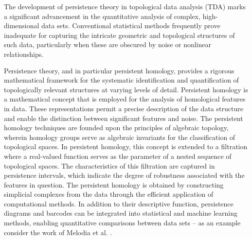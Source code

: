 The development of persistence theory in topological data analysis (TDA) marks a significant advancement in the quantitative analysis of complex, high-dimensional data sets. Conventional statistical methods frequently prove inadequate for capturing the intricate geometric and topological structures of such data, particularly when these are obscured by noise or nonlinear relationships.

Persistence theory, and in particular persistent homology, provides a rigorous mathematical framework for the systematic identification and quantification of topologically relevant structures at varying levels of detail. Persistent homology is a mathematical concept that is employed for the analysis of homological features in data. These representations permit a precise description of the data structure and enable the distinction between significant features and noise. The persistent homology techniques are founded upon the principles of algebraic topology, wherein homology groups serve as algebraic invariants for the classification of topological spaces. In persistent homology, this concept is extended to a filtration where a real-valued function serves as the parameter of a nested sequence of topological spaces. The characteristics of this filtration are captured in persistence intervals, which indicate the degree of robustness associated with the features in question. The persistent homology is obtained by constructing simplicial complexes from the data through the efficient application of computational methods. In addition to their descriptive function, persistence diagrams and barcodes can be integrated into statistical and machine learning methods, enabling quantitative comparisons between data sets -- as an example consider the work of Melodia et al. \cite{melodia2020persistent,melodia2021estimate,melodia2021homological}.

